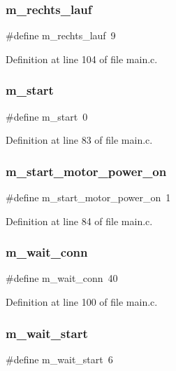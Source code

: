 \subsubsection{m\+\_\+rechts\+\_\+lauf}
{\footnotesize\ttfamily \#define m\+\_\+rechts\+\_\+lauf~9}



Definition at line 104 of file main.\+c.

\mbox{\label{main_8c_a0ef4b78cb1f3483c203c8532177b5e3a}} 
\subsubsection{m\+\_\+start}
{\footnotesize\ttfamily \#define m\+\_\+start~0}



Definition at line 83 of file main.\+c.

\mbox{\label{main_8c_a0e435758792de024e3d8ef966850df3e}} 
\subsubsection{m\+\_\+start\+\_\+motor\+\_\+power\+\_\+on}
{\footnotesize\ttfamily \#define m\+\_\+start\+\_\+motor\+\_\+power\+\_\+on~1}



Definition at line 84 of file main.\+c.

\mbox{\label{main_8c_a39f2dfd053c4956ce52fd9c428a0ae62}} 
\subsubsection{m\+\_\+wait\+\_\+conn}
{\footnotesize\ttfamily \#define m\+\_\+wait\+\_\+conn~40}



Definition at line 100 of file main.\+c.

\mbox{\label{main_8c_af48a58e8013f64d5377dd7b00504f1b5}} 
\subsubsection{m\+\_\+wait\+\_\+start}
{\footnotesize\ttfamily \#define m\+\_\+wait\+\_\+start~6}



